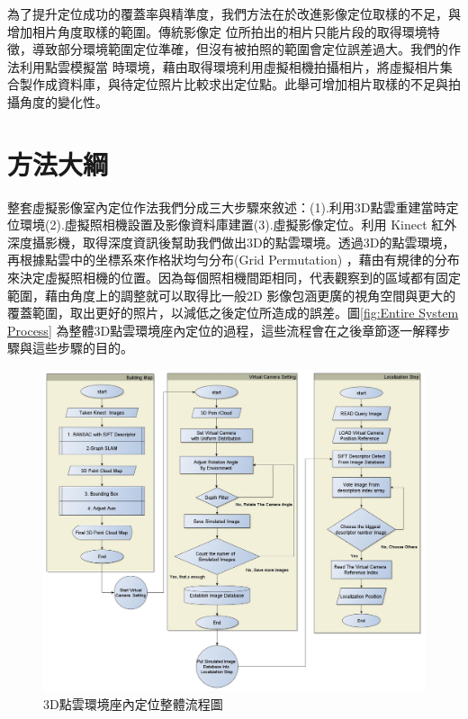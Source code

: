
%

	為了提升定位成功的覆蓋率與精準度，我們方法在於改進影像定位取樣的不足，與增加相片角度取樣的範圍。傳統影像定
位所拍出的相片只能片段的取得環境特徵，導致部分環境範圍定位準確，但沒有被拍照的範圍會定位誤差過大。我們的作法利用點雲模擬當
時環境，藉由取得環境利用虛擬相機拍攝相片，將虛擬相片集合製作成資料庫，與待定位照片比較求出定位點。此舉可增加相片取樣的不足與拍
攝角度的變化性。

\section{方法大綱}
	整套虛擬影像室內定位作法我們分成三大步驟來敘述：(1).利用3D點雲重建當時定位環境(2).虛擬照相機設置及影像資料庫建置(3).虛擬影像定位。利用 
Kinect 紅外深度攝影機，取得深度資訊後幫助我們做出3D的點雲環境。透過3D的點雲環境，再根據點雲中的坐標系來作格狀均勻分布(Grid Permutation)
，藉由有規律的分布來決定虛擬照相機的位置。因為每個照相機間距相同，代表觀察到的區域都有固定範圍，藉由角度上的調整就可以取得比一般2D
影像包涵更廣的視角空間與更大的覆蓋範圍，取出更好的照片，以減低之後定位所造成的誤差。圖\ref{fig:Entire System Process}
為整體3D點雲環境座內定位的過程，這些流程會在之後章節逐一解釋步驟與這些步驟的目的。
 
 
  
\begin{figure}
\begin{center}

  \includegraphics[width=1.1\textwidth]{figures/Enire_System_Process.jpg}
  \caption{3D點雲環境座內定位整體流程圖}
  \label{fig:Enire System Process}
  
\end{center}
\end{figure}
  
